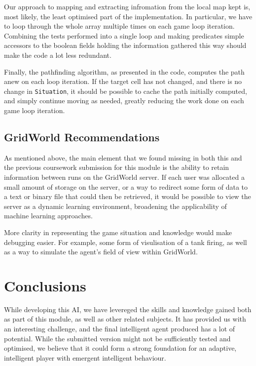 \documentclass[11pt]{article}
\begin{document}
Our approach to mapping and extracting infromation from the local map kept is, most likely, the least optimised part of the implementation. In particular, we have to loop through the whole array multiple times on each game loop iteration. Combining the tests performed into a single loop and making predicates simple accessors to the boolean fields holding the information gathered this way should make the code a lot less redundant.

Finally, the pathfinding algorithm, as presented in the code, computes the path anew on each loop iteration. If the target cell has not changed, and there is no change in \verb|Situation|, it should be possible to cache the path initially computed, and simply continue moving as needed, greatly reducing the work done on each game loop iteration.

\subsection{GridWorld Recommendations}
As mentioned above, the main element that we found missing in both this and the previous coursework submission for this module is the ability to retain information between runs on the GridWorld server. If each user was allocated a small amount of storage on the server, or a way to redirect some form of data to a text or binary file that could then be retrieved, it would be possible to view the server as a dynamic learning environment, broadening the applicability of machine learning approaches.

More clarity in representing the game situation and knowledge would make debugging easier. For example, some form of visulisation of a tank firing, as well as a way to simulate the agent's field of view within GridWorld.

\section{Conclusions}
While developing this AI, we have levereged the skills and knowledge gained both as part of this module, as well as other related subjects. It has provided us with an interesting challenge, and the final intelligent agent produced has a lot of potential. While the submitted version might not be sufficiently tested and optimised, we believe that it could form a strong foundation for an adaptive, intelligent player with emergent intelligent behaviour.

\newpage
{}


\end{document}
